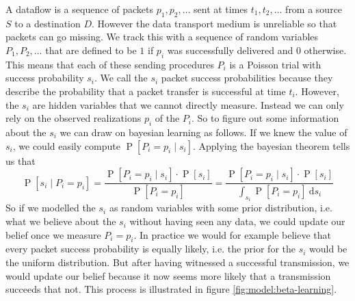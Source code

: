\documentclass[10pt,a4paper]{article}
\DeclareMathOperator{\p}{P}
\begin{document}
A dataflow is a sequence of packets $p_{1}, p_{2}, \dots$ sent at times $t_{1}, t_{2}, \dots$ from a source $S$ to a destination $D$.
However the data transport medium is unreliable so that packets can go missing.
We track this with a sequence of random variables $P_{1}, P_{2}, \dots$ that are defined to be $1$ if $p_{i}$ was successfully delivered and $0$ otherwise.
This means that each of these sending procedures $P_{i}$ is a Poisson trial with success probability $s_{i}$.
We call the $s_{i}$ packet success probabilities because they describe the probability that a packet transfer is successful at time $t_{i}$.
However, the $s_{i}$ are hidden variables that we cannot directly measure.
Instead we can only rely on the observed realizations $p_{i}$ of the $P_{i}$.
So to figure out some information about the $s_{i}$ we can draw on bayesian learning as follows.
If we knew the value of $s_{i}$, we could easily compute $\p[P_{i} = p_{i} \mid s_{i}]$.
Applying the bayesian theorem tells us that
\begin{equation*}
  \p[s_{i} \mid P_{i} = p_{i}] = \frac{\p[P_{i} = p_{i} \mid s_{i}] \cdot \p[s_{i}]}{\p[P_{i} = p_{i}]} = \frac{\p[P_{i} = p_{i} \mid s_{i}] \cdot \p[s_{i}]}{\int_{s_{i}} \p[P_{i} = p_{i}]~\mathrm{d} s_{i}}
\end{equation*}
So if we modelled the $s_{i}$ as random variables with some prior distribution, i.e. what we believe about the $s_{i}$ without having seen any data, we could update our belief once we measure $P_{i} = p_{i}$.
In practice we would for example believe that every packet success probability is equally likely, i.e. the prior for the $s_{i}$ would be the uniform distribution.
But after having witnessed a successful transmission, we would update our belief because it now seems more likely that a transmission succeeds that not.
This process is illustrated in figure \ref{fig:model:beta-learning}.
\end{document}
